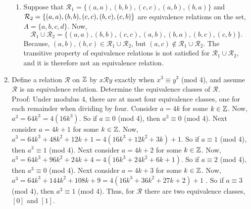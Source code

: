 \documentclass[12pt]{article}
\newcommand{\mc}[1]{\mathcal{#1}}
\begin{document}
\begin{enumerate}
\begin{enumerate}
            \item Suppose that \(\mc R_1 = \{(a,a), (b,b), (c,c), (a,b), (b,a)\}\) and \(\mc R_2 = \{(a,a), (b,b), (c,c),\\ (b,c), (c,b)\}\) are equivalence relations on the set, \(A = \{a, b, c, d\}\). Now, \begin{equation*}
                \mc R_1 \cup \mc R_2 = \{(a,a), (b,b), (c,c), (a,b), (b,a), (b,c), (c,b)\}.
            \end{equation*}
            Because, \((a,b), (b,c)\in \mc R_1 \cup \mc R_2\), but \((a,c) \not\in\mc R_1 \cup \mc R_2\). The transitive property of equivalence relations is not satisfied for \(\mc R_1 \cup \mc R_2\), and it is therefore not an equivalence relation.
        \end{enumerate}
        \item Define a relation \(\mc R\) on \(\mathbb{Z}\) by \(x\mc Ry\) exactly when \(x^3 \equiv y^3 \) (mod 4), and assume \(\mc R\) is an equivalence relation. Determine the equivalence classes of \(\mc R\). \\ {\sc Proof:} Under modulus 4, there are at most four equivalence classes, one for each remainder when dividing by four. Consider \(a = 4k\) for some \(k \in \mathbb{Z}\). Now, \(a^3 = 64k^3 = 4(16k^3)\). So if \(a \equiv 0 \) (mod 4), then \(a^3 \equiv 0\) (mod 4). Next consider \(a = 4k + 1 \) for some \(k \in \mathbb{Z}\). Now, \(a^3 = 64k^3 + 48k^2 + 12k + 1 = 4(16k^3 + 12k^2 + 3k) + 1\). So if \(a \equiv 1 \) (mod 4), then \(a^3 \equiv 1\) (mod 4). Next consider \(a = 4k + 2 \) for some \(k \in \mathbb{Z}\). Now, \(a^3 = 64k^3 + 96k^2 + 24k + 4 = 4(16k^3 + 24k^2 + 6k+ 1)\). So if \(a \equiv 2\) (mod 4), then \(a^3 \equiv 0\) (mod 4). Next consider \(a = 4k + 3 \) for some \(k \in \mathbb{Z}\). Now, \(a^3 = 64k^3 + 144k^2 + 108k + 9 = 4(16k^3 + 36k^2 + 27k + 2 ) + 1\) . So if \(a \equiv 3 \) (mod 4), then \(a^3 \equiv 1\) (mod 4). Thus, for \(\mc R\) there are two equivalence classes, \([0]\) and \([1]\).
    \end{enumerate}
\end{document}

